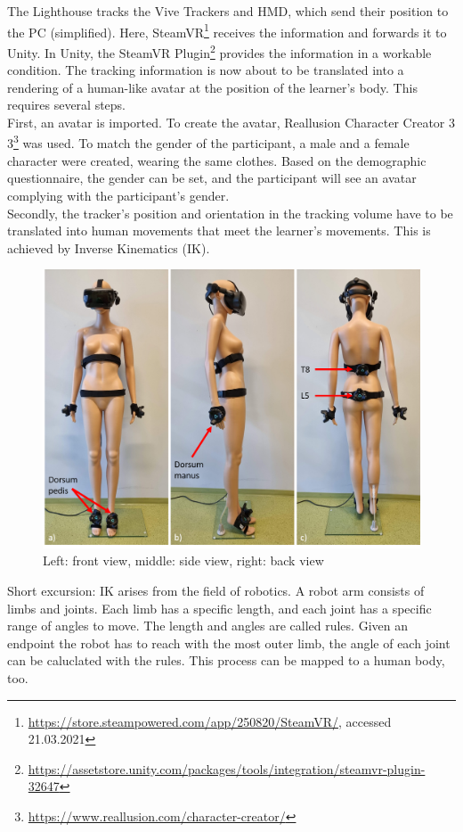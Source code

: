 The Lighthouse tracks the Vive Trackers and HMD, which send their position to the PC (simplified). Here, SteamVR\footnote{\href{https://store.steampowered.com/app/250820/SteamVR/}{https://store.steampowered.com/app/250820/SteamVR/}, accessed 21.03.2021} receives the information and forwards it to Unity. In Unity, the SteamVR Plugin\footnote{\href{https://assetstore.unity.com/packages/tools/integration/steamvr-plugin-32647}{https://assetstore.unity.com/packages/tools/integration/steamvr-plugin-32647}} provides the information in a workable condition. The tracking information is now about to be translated into a rendering of a human-like avatar at the position of the learner's body. This requires several steps.\\First, an avatar is imported. To create the avatar, Reallusion Character Creator 3 3\footnote{\href{https://www.reallusion.com/character-creator/}{https://www.reallusion.com/character-creator/}} was used. To match the gender of the participant, a male and a female character were created, wearing the same clothes. Based on the demographic questionnaire, the gender can be set, and the participant will see an avatar complying with the participant's gender.\\
Secondly, the tracker's position and orientation in the tracking volume have to be translated into human movements that meet the learner's movements. This is achieved by Inverse Kinematics (IK).\\
\begin{figure}[htb]
	\centering
	\includegraphics[width=\textwidth]{figures/trackerPlacement.png}	
	\caption[Tracker placement]{Left: front view, middle: side view, right: back view}
	\label{fig:tracker_placement}
\end{figure}
Short excursion: IK arises from the field of robotics. A robot arm consists of limbs and joints. Each limb has a specific length, and each joint has a specific range of angles to move. The length and angles are called rules. Given an endpoint the robot has to reach with the most outer limb, the angle of each joint can be caluclated with the rules. This process can be mapped to a human body, too.\\


